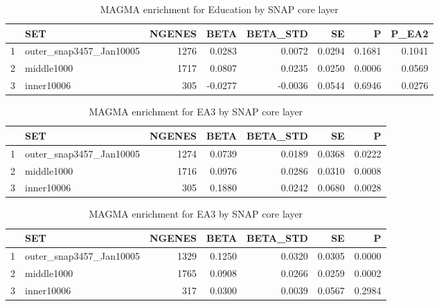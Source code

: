 \begin{table}[ht]
\centering
\begin{tabular}{rlrrrrrr}
  \hline
 & SET & NGENES & BETA & BETA\_STD & SE & P & P\_EA2 \\ 
  \hline
1 & outer\_snap3457\_Jan10005 &  1276 & 0.0283 & 0.0072 & 0.0294 & 0.1681 & 0.1041 \\ 
  2 & middle1000 &  1717 & 0.0807 & 0.0235 & 0.0250 & 0.0006 & 0.0569 \\ 
  3 & inner10006 &   305 & -0.0277 & -0.0036 & 0.0544 & 0.6946 & 0.0276 \\ 
   \hline
\end{tabular}
\caption{MAGMA enrichment for Education by SNAP core layer} 
\label{Table:MAGMA enrichment for Education by SNAP core layer}
\end{table}
\begin{table}[ht]
\centering
\begin{tabular}{rlrrrrr}
  \hline
 & SET & NGENES & BETA & BETA\_STD & SE & P \\ 
  \hline
1 & outer\_snap3457\_Jan10005 &  1274 & 0.0739 & 0.0189 & 0.0368 & 0.0222 \\ 
  2 & middle1000 &  1716 & 0.0976 & 0.0286 & 0.0310 & 0.0008 \\ 
  3 & inner10006 &   305 & 0.1880 & 0.0242 & 0.0680 & 0.0028 \\ 
   \hline
\end{tabular}
\caption{MAGMA enrichment for EA3 by SNAP core layer} 
\label{Table:MAGMA enrichment for EA3 by SNAP core layer}
\end{table}
\begin{table}[ht]
\centering
\begin{tabular}{rlrrrrr}
  \hline
 & SET & NGENES & BETA & BETA\_STD & SE & P \\ 
  \hline
1 & outer\_snap3457\_Jan10005 &  1329 & 0.1250 & 0.0320 & 0.0305 & 0.0000 \\ 
  2 & middle1000 &  1765 & 0.0908 & 0.0266 & 0.0259 & 0.0002 \\ 
  3 & inner10006 &   317 & 0.0300 & 0.0039 & 0.0567 & 0.2984 \\ 
   \hline
\end{tabular}
\caption{MAGMA enrichment for EA3 by SNAP core layer} 
\label{Table:MAGMA enrichment for EA3 by SNAP core layer}
\end{table}
